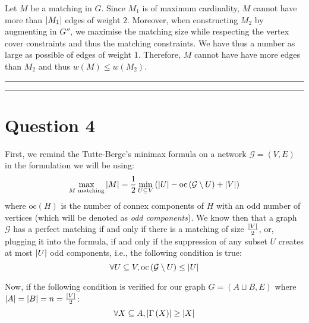 \documentclass[math]{cours}
\def\oc{\mathrm{oc}}
\begin{document}
Let $M$ be a matching in $G$.
Since $M_{1}$ is of maximum cardinality, $M$ cannot have more than $\left|M_{1}\right|$ edges of weight $2$.
Moreover, when constructing $M_{2}$ by augmenting in $G''$, we maximise the matching size while respecting the vertex cover constraints and thus the matching constraints.
We have thus a number as large as possible of edges of weight $1$.
Therefore, $M$ cannot have have more edges than $M_{2}$ and thus $w(M) \leq w(M_{2})$.

\medskip
\hrule\hrule
\medskip

\section{Question 4}
First, we remind the Tutte-Berge's minimax formula on a network $\mathcal{G} = \left(V, E\right)$ in the formulation we will be using:
\begin{equation}
	\max_{M \text{ matching}} \abs{M} = \frac{1}{2}\min_{U \subseteq V} \left(\abs{U} - \oc\left(\mathcal{G} \setminus U\right) + \abs{V} \right)
\end{equation}
where $\oc(H)$ is the number of connex components of $H$ with an odd number of vertices (which will be denoted as \emph{odd components}).
We know then that a graph $\mathcal{G}$ has a perfect matching if and only if there is a matching of size $\frac{\left|V\right|}{2}$, or, plugging it into the formula, if and only if the suppression of any subset $U$ creates at most $\left|U\right|$ odd components, i.e., the following condition is true:
\begin{equation}
	\label{eq:tuttecondition}
	\forall U \subseteq V, \oc\left(\mathcal{G} \setminus U\right) \leq \abs{U}
\end{equation}

Now, if the following condition is verified for our graph $G = \left(A\sqcup B, E\right)$ where $\left|A\right| = \left|B\right| = n = \frac{\left|V\right|}{2}$:
\begin{equation}
	\forall X \subseteq A, \left|\Gamma\left(X\right)\right| \geq \left|X\right|
	\label{eq:hallcondition}
\end{equation}
\end{document}
